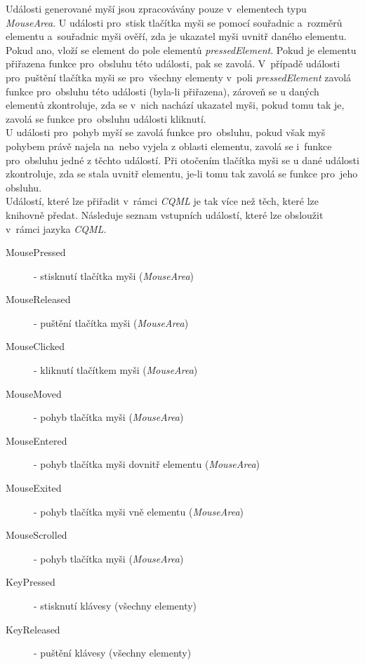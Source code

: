 \documentclass[11pt,twoside,a4paper]{book}
\begin{document}
Události generované myší jsou zpracovávány pouze v~elementech typu \textit{MouseArea}. U události pro~stisk tlačítka myši se pomocí souřadnic a~rozměrů elementu a~souřadnic myši ověří, zda je ukazatel myši uvnitř daného elementu. Pokud ano, vloží se element do pole elementů \textit{pressedElement}. Pokud je elementu přiřazena funkce pro~obsluhu této události, pak se zavolá. V~případě události pro~puštění tlačítka myši se pro~všechny elementy v~poli \textit{pressedElement} zavolá funkce pro~obsluhu této události (byla-li přiřazena), zároveň se u daných elementů zkontroluje, zda se v~nich nachází ukazatel myši, pokud tomu tak je, zavolá se funkce pro~obsluhu události kliknutí.\\
U události pro~pohyb myší se zavolá funkce pro~obsluhu, pokud však myš pohybem právě najela na~nebo vyjela z oblasti elementu, zavolá se i~funkce pro~obsluhu jedné z těchto událostí. Při otočením tlačítka myši se u dané události zkontroluje, zda se stala uvnitř elementu, je-li tomu tak zavolá se funkce pro~jeho obsluhu.\\
Událostí, které lze přiřadit v~rámci \textit{CQML} je tak více než těch, které lze knihovně předat. Následuje seznam vstupních událostí, které lze obsloužit v~rámci jazyka \textit{CQML}.
\begin{description}
\item[MousePressed] - stisknutí tlačítka myši (\textit{MouseArea})
\item[MouseReleased] - puštění tlačítka myši (\textit{MouseArea})
\item[MouseClicked] - kliknutí tlačítkem myši (\textit{MouseArea})
\item[MouseMoved] - pohyb tlačítka myši (\textit{MouseArea})
\item[MouseEntered] - pohyb tlačítka myši dovnitř elementu (\textit{MouseArea})
\item[MouseExited] - pohyb tlačítka myši vně elementu (\textit{MouseArea})
\item[MouseScrolled] - pohyb tlačítka myši (\textit{MouseArea})
\item[KeyPressed] - stisknutí klávesy (všechny elementy)
\item[KeyReleased] - puštění klávesy (všechny elementy)
\end{description}
\end{document}
